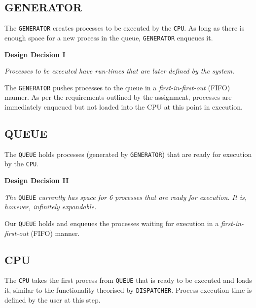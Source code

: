\documentclass[]{article}
\begin{document}
\subsection*{GENERATOR}
The \verb|GENERATOR| creates processes to be executed by the \verb|CPU|. As long as there is enough space for a new process in the queue, \verb|GENERATOR| enqueues it. \par \vspace{2mm}

\begin{mdframed}[backgroundcolor=lightgray!40]
	\textbf{Design Decision I} \par 
	\textit{Processes to be executed have run-times that are later defined by the system.}
\end{mdframed}

\vspace{2mm}

The \verb|GENERATOR| pushes processes to the queue in a \textit{first-in-first-out} (FIFO) manner. As per the requirements outlined by the assignment,  processes are immediately enqueued but not loaded into the CPU at this point in execution. 

\subsection*{QUEUE}
The \verb|QUEUE| holds processes (generated by \verb|GENERATOR|) that are ready for execution by the \verb|CPU|. \par \vspace{2mm}

\begin{mdframed}[backgroundcolor=lightgray!40]
	\textbf{Design Decision II} \par 
	\textit{The} \verb|QUEUE| \textit{currently has space for 6 processes that are ready for execution. It is, however, infinitely expandable.}
\end{mdframed}

\vspace{2mm}

Our \verb|QUEUE| holds and enqueues the processes waiting for execution in a  \textit{first-in-first-out} (FIFO) manner. 

\subsection*{CPU}
The \verb|CPU| takes the first process from \verb|QUEUE| that is ready to be executed and loads it, similar to the functionality theorised by \verb|DISPATCHER|. Process execution time is defined by the user at this step. \par \vspace{2mm}
\end{document}
